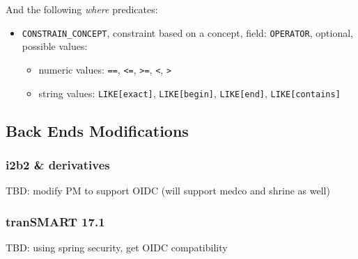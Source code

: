 And the following \emph{where} predicates:
\begin{itemize}
    \item \verb|CONSTRAIN_CONCEPT|, constraint based on a concept, field:
    \verb|OPERATOR|, optional, possible values:
    \begin{itemize}
        \item numeric values: \verb|==|, \verb|<=|, \verb|>=|, \verb|<|, \verb|>|
        \item string values: \verb|LIKE[exact]|, \verb|LIKE[begin]|, \verb|LIKE[end]|, \verb|LIKE[contains]|
    \end{itemize}
\end{itemize}


\subsection{Back Ends Modifications}
\subsubsection{i2b2 \& derivatives}
TBD: modify PM to support OIDC (will support medco and shrine as well)

\subsubsection{tranSMART 17.1}
TBD: using spring security, get OIDC compatibility
